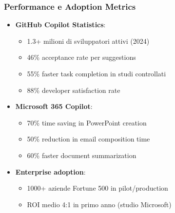 \documentclass[aspectratio=169]{beamer}
\begin{document}
\begin{frame}
\frametitle{Performance e Adoption Metrics}
\begin{itemize}
    \item \textbf{GitHub Copilot Statistics}:
    \begin{itemize}
        \item 1.3+ milioni di sviluppatori attivi (2024)
        \item 46\% acceptance rate per suggestions
        \item 55\% faster task completion in studi controllati
        \item 88\% developer satisfaction rate
    \end{itemize}
    \item \textbf{Microsoft 365 Copilot}:
    \begin{itemize}
        \item 70\% time saving in PowerPoint creation
        \item 50\% reduction in email composition time
        \item 60\% faster document summarization
    \end{itemize}
    \item \textbf{Enterprise adoption}:
    \begin{itemize}
        \item 1000+ aziende Fortune 500 in pilot/production
        \item ROI medio 4:1 in primo anno (studio Microsoft)
    \end{itemize}
\end{itemize}
\end{frame}
%
%
\end{document}
